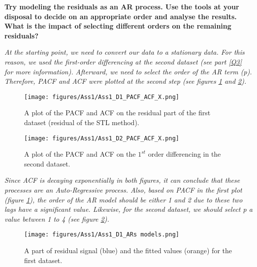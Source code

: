 \item \textbf{Try modeling the residuals as an AR process. Use the tools at your disposal to decide on an appropriate order and analyse the results. What is the impact of selecting different orders on the remaining residuals?}




\textit{At the starting point, we need to convert our data to a stationary data. For this reason, we used the first-order differencing at the second dataset (see part \ref{Q3} for more information).}
\textit{Afterward, we need to select the order of the \gls{AR} term (p). Therefore, \gls{PACF} and \gls{ACF} were plotted at the second step (see figures \ref{fig:Ass1_D1_PACF_ACF_X} and \ref{fig:Ass1_D2_PACF_ACF_X}).}  

\begin{figure}[H]
    \centering
    \begin{minipage}[b]{1\textwidth}
        \texttt{[image: figures/Ass1/Ass1\_D1\_PACF\_ACF\_X.png]}
    \end{minipage}
    \caption{A plot of the \gls{PACF} and \gls{ACF} on the residual part of the first dataset (residual of the STL method).}
    \label{fig:Ass1_D1_PACF_ACF_X}
\end{figure}

\begin{figure}[H]
    \centering
    \begin{minipage}[b]{1\textwidth}
        \texttt{[image: figures/Ass1/Ass1\_D2\_PACF\_ACF\_X.png]}
    \end{minipage}
    \caption{A plot of the \gls{PACF} and \gls{ACF} on the $1^{st}$ order differencing in the second dataset.}
    \label{fig:Ass1_D2_PACF_ACF_X}
\end{figure}


\textit{Since \gls{ACF} is decaying exponentially in both figures, it can conclude that these processes are an Auto-Regressive process. Also, based on \gls{PACF} in the first plot (figure \ref{fig:Ass1_D1_PACF_ACF_X}), the order of the \gls{AR} model should be either 1 and 2 due to these two lags have a significant value. Likewise, for the second dataset, we should select p a value between 1 to 4 (see figure \ref{fig:Ass1_D2_PACF_ACF_X}).}

\begin{figure}[H]
    \centering
    \begin{minipage}[b]{1\textwidth}
        \texttt{[image: figures/Ass1/Ass1\_D1\_ARs models.png]}
    \end{minipage}
    \caption{A part of residual signal (blue) and the fitted values (orange) for the first dataset.}
    \label{fig:Ass1_D1_ARs_models}
\end{figure}

